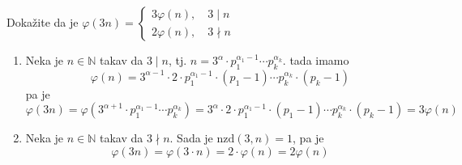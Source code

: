 \documentclass{exam}
\begin{document}
\begin{questions}
\begin{solution}
\end{solution}

\question Dokažite da je $\varphi(3n) =
\begin{cases}
  3\varphi(n), \quad 3 \mid n\\
  2\varphi(n), \quad 3 \nmid n
\end{cases}$

\begin{solution}
  \begin{enumerate}
    \item Neka je $n \in \mathbb{N}$ takav da $3 \mid n$, tj. $n =  3^{\alpha} \cdot p_1^{\alpha_1 - 1} \cdots p_k^{\alpha_k}$. tada imamo
      \[
        \varphi(n) = 3^{\alpha - 1} \cdot 2 \cdot p_1^{\alpha_1 - 1} \cdot (p_1 - 1) \cdots p_k^{\alpha_k} \cdot (p_k - 1)
      \]
      pa je
      \[
        \varphi(3n) = \varphi(3^{\alpha + 1} \cdot p_1^{\alpha_1 - 1} \cdots p_k^{\alpha_k}) = 3^{\alpha} \cdot 2 \cdot p_1^{\alpha_1 - 1} \cdot (p_1 - 1) \cdots p_k^{\alpha_k} \cdot (p_k - 1) = 3 \varphi(n)
      \]
    \item Neka je $n \in \mathbb{N}$ takav da $3 \nmid n$. Sada je $\text{nzd}(3, n) = 1$, pa je
      \[
        \varphi(3n) = \varphi(3 \cdot n) = 2 \cdot \varphi(n) = 2\varphi(n)
      \]
  \end{enumerate}
\end{solution}


\end{questions}
\end{document}
